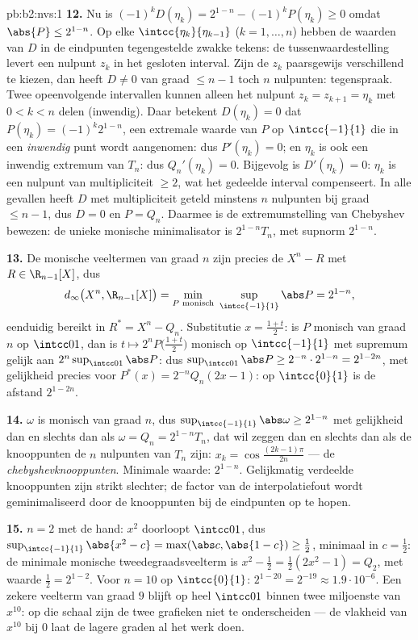 \begin{solution}{pb:b2:nvs:1}
\textbf{12.} Nu is $(-1)^kD(\eta_k) = 2^{1-n} - (-1)^kP(\eta_k)
\geq 0$ omdat $\abs{P} \leq 2^{1-n}$. Op elke
$\intcc{\eta_k}{\eta_{k-1}}$ ($k = 1, \dots, n$) hebben de waarden
van $D$ in de eindpunten tegengestelde zwakke tekens: de
tussenwaardestelling levert een nulpunt $z_k$ in het gesloten
interval. Zijn de $z_k$ paarsgewijs verschillend te kiezen, dan
heeft $D \neq 0$ van graad $\leq n-1$ toch $n$ nulpunten:
tegenspraak. Twee opeenvolgende intervallen kunnen alleen het
nulpunt $z_k = z_{k+1} = \eta_k$ met $0 < k < n$ delen (inwendig).
Daar betekent $D(\eta_k) = 0$ dat $P(\eta_k) = (-1)^k2^{1-n}$, een
extremale waarde van $P$ op $\intcc{-1}{1}$ die in een
\emph{inwendig} punt wordt aangenomen: dus $P'(\eta_k) = 0$; en
$\eta_k$ is ook een inwendig extremum van $T_n$: dus $Q_n'(\eta_k)
= 0$. Bijgevolg is $D'(\eta_k) = 0$: $\eta_k$ is een nulpunt van
multipliciteit $\geq 2$, wat het gedeelde interval compenseert. In
alle gevallen heeft $D$ met multipliciteit geteld minstens $n$
nulpunten bij graad $\leq n - 1$, dus $D = 0$ en $P = Q_n$. Daarmee
is de extremumstelling van Chebyshev bewezen: de unieke monische
minimalisator is $2^{1-n}T_n$, met supnorm $2^{1-n}$.

\textbf{13.} De monische veeltermen van graad $n$ zijn precies de
$X^n - R$ met $R \in \R_{n-1}[X]$, dus
\[
d_\infty\bigl(X^n, \R_{n-1}[X]\bigr) = \min_{P \text{
monisch}}\ \sup_{\intcc{-1}{1}}\abs P = 2^{1-n},
\]
eenduidig bereikt in $R^* = X^n - Q_n$. Substitutie $x =
\frac{1+t}2$: is $P$ monisch van graad $n$ op $\intcc01$, dan is $t
\mapsto 2^nP\bigl(\frac{1+t}2\bigr)$ monisch op $\intcc{-1}{1}$
met supremum gelijk aan $2^n\sup_{\intcc01}\abs P$: dus
$\sup_{\intcc01}\abs P \geq 2^{-n}\cdot2^{1-n} = 2^{1-2n}$, met
gelijkheid precies voor $P^*(x) = 2^{-n}Q_n(2x - 1)$: op
$\intcc{0}{1}$ is de afstand $2^{1-2n}$.

\textbf{14.} $\omega$ is monisch van graad $n$, dus
$\sup_{\intcc{-1}{1}}\abs\omega \geq 2^{1-n}$ met gelijkheid dan en
slechts dan als $\omega = Q_n = 2^{1-n}T_n$, dat wil zeggen dan en
slechts dan als de knooppunten de $n$ nulpunten van $T_n$ zijn:
$x_k = \cos\frac{(2k-1)\pi}{2n}$ --- de
\emph{chebyshevknooppunten}. Minimale waarde: $2^{1-n}$.
Gelijkmatig verdeelde knooppunten zijn strikt slechter; de factor
van de interpolatiefout wordt geminimaliseerd door de knooppunten
bij de eindpunten op te hopen.

\textbf{15.} $n = 2$ met de hand: $x^2$ doorloopt $\intcc01$, dus
$\sup_{\intcc{-1}{1}}\abs{x^2 - c} = \max(\abs c, \abs{1 - c})
\geq \frac12$, minimaal in $c = \frac12$: de minimale monische
tweedegraadsveelterm is $x^2 - \frac12 = \frac12(2x^2 - 1) = Q_2$,
met waarde $\frac12 = 2^{1-2}$. Voor $n = 10$ op $\intcc{0}{1}$:
$2^{1-20} = 2^{-19} \approx 1.9\cdot10^{-6}$. Een zekere veelterm
van graad $9$ blijft op heel $\intcc01$ binnen twee miljoenste van
$x^{10}$: op die schaal zijn de twee grafieken niet te
onderscheiden --- de vlakheid van $x^{10}$ bij $0$ laat de lagere
graden al het werk doen.


\end{solution}
